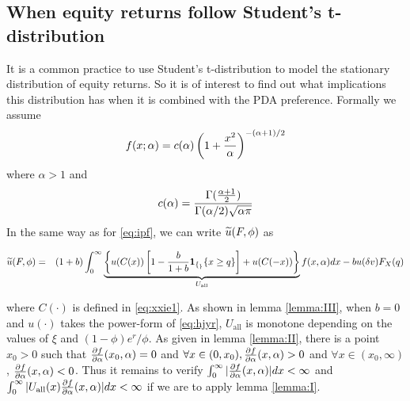 \begin{subappendices}
\section{When equity returns follow Student's t-distribution}
\setcounter{equation}{0}
It is a common practice to use Student's t-distribution to model the
stationary distribution of equity returns. So it is of interest to
find out what implications this distribution has when it is combined
with the PDA preference. Formally we assume
\[
f(x; \alpha) = c(\alpha) \left(
  1 + {x^2 \over \alpha}
\right)^{-(\alpha + 1)/2}
\]
where $\alpha > 1$ and
\[
c(\alpha) = {
  \Gamma({\alpha + 1 \over 2})
  \over
  \Gamma(\alpha/2) \sqrt{\alpha \pi}
}
\]
In the same way as for \eqref{eq:ipf}, we can write $\widetilde u(F, \phi)$
as
\begin{small}
  \begin{eqnarray}
    \widetilde u(F, \phi)
    &=&
    (1 + b)
    \int_{0}^{\infty}
    \underbrace{
      \left\{
      u(C(x)) \left[
        1 - {b \over 1 + b}\mathbf{1}_{\{_\}}{\{x \ge q\}}
        \right]
      + u(C(-x))
      \right\}
    }_{U_{\text{all}}}
    f(x, \alpha) dx - b u(\delta v) F_X(q)
    \label{eq:t1}
  \end{eqnarray}
\end{small}
where $C(\cdot)$ is defined in \eqref{eq:xxie1}. As shown in lemma
\ref{lemma:III}, when $b = 0$ and $u(\cdot)$
takes the power-form of \eqref{eq:hjyr}, $U_{\text{all}}$ is monotone
depending on the values of $\xi$ and $(1 - \phi) e^r / \phi$. As given
in lemma \ref{lemma:II}, there is a point $x_0 > 0$ such that
${\partial f \over \partial \alpha}(x_0, \alpha) = 0$ and
$\forall x \in (0, x_0),
{\partial f \over  \partial \alpha}(x, \alpha) > 0$ and
$\forall x \in (x_0, \infty)$,
${\partial f \over \partial \alpha}(x, \alpha) < 0$. Thus it remains to verify
$\int_0^\infty |{\partial f \over \partial \alpha}(x, \alpha)| dx < \infty$ and
$\int_0^\infty |U_{\text{all}}(x){\partial f \over \partial \alpha}(x, \alpha)| dx < \infty$
if we are to apply lemma \ref{lemma:I}.


\end{subappendices}
